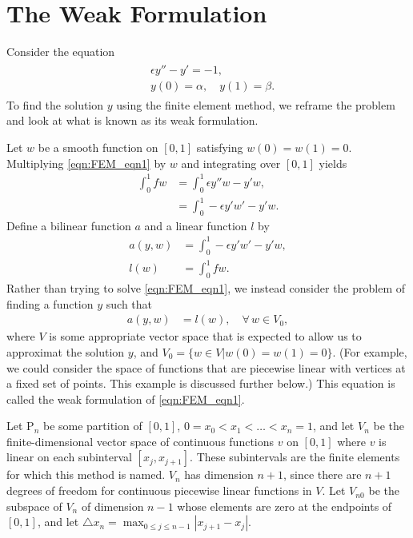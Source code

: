 \section*{The Weak Formulation}
Consider the equation
\begin{align}
	\begin{split}
	&{ }\epsilon y'' - y' = -1,\\
	&{ }y(0) = \alpha, \quad y(1) = \beta .
	\end{split}\label{eqn:FEM_eqn1}
\end{align}
To find the solution $y$ using the finite element method, we reframe the problem and look at what is known as its weak formulation.

Let $w$ be a smooth function on $[0,1]$ satisfying $w(0) = w(1) = 0$.
Multiplying \eqref{eqn:FEM_eqn1} by $w$ and integrating over $[0,1]$ yields
\begin{align*}
	\int_0^1 f w &= \int_0^1 \epsilon y''w - y'w, \\
	&= \int_0^1 -\epsilon y'w' - y'w.
\end{align*}
Define a bilinear function $a$ and a linear function $l$ by
\begin{align*}
a(y,w) &= \int_0^1 -\epsilon y'w' - y'w,\\
l(w) &= \int_0^1 f w.
\end{align*}
Rather than trying to solve \eqref{eqn:FEM_eqn1}, we instead consider the problem of finding a function $y$ such that
\begin{align}
	a(y,w) &= l(w), \quad \forall \, w \in V_0,
	\label{eqn:FEM_integral_form}
\end{align}
where $V$ is some appropriate vector space that is expected to allow us to approximat the solution $y$, and $V_0 = \{w \in V|w(0) = w(1) = 0\}$.
(For example, we could consider the space of functions that are piecewise linear with vertices at a fixed set of points.
This example is discussed further below.)
This equation is called the weak formulation of \eqref{eqn:FEM_eqn1}.

Let $\mathrm{P}_n$ be some partition of $[0,1]$, $0 = x_0 < x_1< \ldots < x_{n} = 1$, and let $V_n$ be the finite-dimensional vector space of continuous functions $v$ on $[0,1]$ where $v$ is linear on each subinterval $[{x_j,x_{j+1}}]$.
These subintervals are the finite elements for which this method is named.
$V_n$ has dimension $n+1$, since there are $n+1$ degrees of freedom for continuous piecewise linear functions in $V$.
Let $V_{n0}$ be the subspace of $V_n$ of dimension $n-1$ whose elements are zero at the endpoints of $[0,1]$, and let $\triangle x_n = \max_{0 \leq j \leq n-1}|x_{j+1} - x_j|$.

